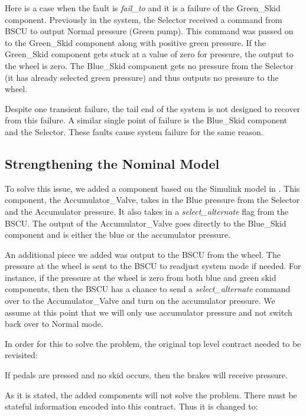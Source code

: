 Here is a case when the fault is \textit{fail\_to} and it is a failure of the Green\_Skid component. Previously in the system, the Selector received a command from BSCU to output Normal pressure (Green pump). This command was passed on to the Green\_Skid component along with positive green pressure. If the Green\_Skid component gets stuck at a value of zero for pressure, the output to the wheel is zero. The Blue\_Skid component gets no pressure from the Selector (it has already selected green pressure) and thus outputs no pressure to the wheel. 

Despite one transient failure, the tail end of the system is not designed to recover from this failure. A similar single point of failure is the Blue\_Skid component and the Selector. These faults cause system failure for the same reason. 

\subsection{Strengthening the Nominal Model}
To solve this issue, we added a component based on the Simulink model in \cite{Joshi05:Dasc}. This component, the Accumulator\_Valve, takes in the Blue pressure from the Selector and the Accumulator pressure. It also takes in a \textit{select\_alternate} flag from the BSCU. The output of the Accumulator\_Valve goes directly to the Blue\_Skid component and is either the blue or the accumulator pressure. 

An additional piece we added was output to the BSCU from the wheel. The pressure at the wheel is sent to the BSCU to readjust system mode if needed. For instance, if the pressure at the wheel is zero from both blue and green skid components, then the BSCU has a chance to send a \textit{select\_alternate} command over to the Accumulator\_Valve and turn on the accumulator pressure. We assume at this point that we will only use accumulator pressure and not switch back over to Normal mode. 

In order for this to solve the problem, the original top level contract needed to be revisited: 

\begin{tt}
If pedals are pressed and no skid occurs, then the brakes will receive pressure. 
\end{tt}

As it is stated, the added components will not solve the problem. There must be stateful information encoded into this contract. Thus it is changed to: 

